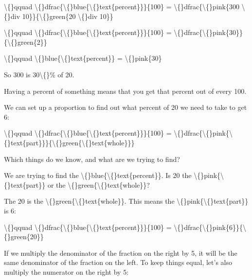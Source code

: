 \documentclass{article}
\begin{document}
\begin{itemize}
{{{{{{                        
                            \textbackslash\{\}qquad \textbackslash\{\}dfrac\{\textbackslash\{\}blue\{\textbackslash\{\}text\{percent\}\}\}\{100\} =
                            \textbackslash\{\}dfrac\{\textbackslash\{\}pink\{300 \textbackslash\{\}div 10\}\}\{\textbackslash\{\}green\{20 \textbackslash\{\}div 10\}\}
                        
                        
                            \textbackslash\{\}qquad \textbackslash\{\}dfrac\{\textbackslash\{\}blue\{\textbackslash\{\}text\{percent\}\}\}\{100\} =
                            \textbackslash\{\}dfrac\{\textbackslash\{\}pink\{30\}\}\{\textbackslash\{\}green\{2\}\}
                        
                        \textbackslash\{\}qquad \textbackslash\{\}blue\{\textbackslash\{\}text\{percent\}\} = \textbackslash\{\}pink\{30\}
  \item So 300 is 30\textbackslash\{\}\% of 20.
  \item Having a percent of something means that you get that percent out of every 100.
  \item We can set up a proportion to find out what percent of 20
                            we need to take to get 6:
                        
                        
                            \textbackslash\{\}qquad \textbackslash\{\}dfrac\{\textbackslash\{\}blue\{\textbackslash\{\}text\{percent\}\}\}\{100\} =
                            \textbackslash\{\}dfrac\{\textbackslash\{\}pink\{\textbackslash\{\}text\{part\}\}\}\{\textbackslash\{\}green\{\textbackslash\{\}text\{whole\}\}\}
  \item Which things do we know, and what are we trying to find?
  \item We are trying to find the \textbackslash\{\}blue\{\textbackslash\{\}text\{percent\}\}.
                        Is 20 the \textbackslash\{\}pink\{\textbackslash\{\}text\{part\}\}
                        or the \textbackslash\{\}green\{\textbackslash\{\}text\{whole\}\}?
  \item The 20 is the \textbackslash\{\}green\{\textbackslash\{\}text\{whole\}\}.
                            This means the \textbackslash\{\}pink\{\textbackslash\{\}text\{part\}\} is 6:
                        
                        
                            \textbackslash\{\}qquad \textbackslash\{\}dfrac\{\textbackslash\{\}blue\{\textbackslash\{\}text\{percent\}\}\}\{100\} =
                            \textbackslash\{\}dfrac\{\textbackslash\{\}pink\{6\}\}\{\textbackslash\{\}green\{20\}\}
  \item If we multiply the denominator of the fraction on the right by 5,
                            it will be the same denominator of the fraction on the left.
                            To keep things equal, let's also multiply the numerator on the right by 5:
                        
}}}}}}
\end{itemize}
\end{document}
